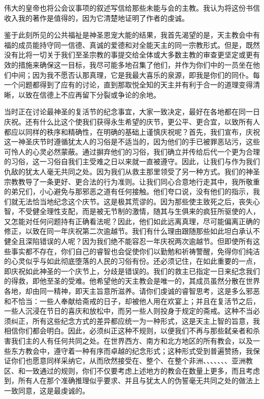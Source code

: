 伟大的皇帝也将公会议事项的叙述写信给那些未能与会的主教。我认为将这份书信收入我的著作是值得的，因为它清楚地证明了作者的虔诚。\par

\par

鉴于此刻所见的公共福祉是神圣恩宠大能的结果，我首先渴望的是，天主教会中有福的成员能持守同一信德、真诚的爱德和对全能天主的同一宗教形式。但是，既然没有比将一切关于我们至圣宗教的事提交给全体或大多数主教的审查更坚定或更有效的措施来确保这一目标，我尽可能多地召集了他们，并作为你们中的一员坐在他们中间；因为我不愿否认那真理，它是我最大喜乐的泉源，即我是你们的同仆。每一个问题都得到了应有的讨论，直到那取悦全知的天主并有利于合一的道理变得清晰，以致在信德上不应再留下分裂或争论的余地。\par

当时正在讨论最神圣的复活节的纪念事宜，大家一致决定，最好在各地都在同一日庆祝。还有什么比这个使我们获得永生希望的庆节，更公平、更合宜，以致所有人都应以同样的秩序和精确性，在明确的基础上谨慎庆祝呢？首先，我们宣布，庆祝这一神圣庆节时遵循犹太人的习俗是不适当的，因为他们的手已被罪恶玷污，这些可怜人的心灵必然蒙蔽。通过摒弃他们的习俗，我们确立并传给后代一个更为合理的习俗，这一习俗自我们主受难之日以来就一直被遵守。因此，让我们与作为我们仇敌的犹太人毫无共同之处。因为我们从救主那里领受了另一种方式。我们的神圣宗教教导了一条更好、更合法的行为准则。让我们同心合意地行走其中，我所敬重的弟兄们，小心避免与那邪恶之道有任何接触。他们夸口说，没有他们的指示，我们就无法恰当地纪念这个庆节。这是极其荒谬的。因为那些使主致死之后，丧失心智，不受健全理性支配，而是被无节制的激情，随其与生俱来的疯狂所驱使的人，又怎能对任何问题持有正确看法呢？因此，他们如此远离真理，尽可能偏离正确的修正，以致在同一年庆祝第二次逾越节。我们有什么理由跟随那些如此坦白承认不健全且深陷错误的人呢？因为我们绝不能容忍一年庆祝两次逾越节。但即使所有这些事实都不存在，你们自己的睿智也会促使你们以勤勉和祈祷警醒，免得你们纯洁的心灵似乎与如此彻底堕落的人民的习俗有份。还必须记住，在如此重要的一点，即庆祝如此神圣的一个庆节上，分歧是错误的。我们的救主已指定一日来纪念我们的得救，即他至圣的受难。他希望他的天主教会是唯一的，其成员虽然分散在世界各地，却由同一精神，即天主旨意所滋养。请你们虔诚的睿智思考，这是多么邪恶和不恰当：一些人奉献给斋戒的日子，却被他人用在欢宴上；并且在复活节之后，一些人沉浸在节日的喜庆和放松中，而另一些人则投身于规定的斋戒。这种不当必须纠正，所有这些纪念方式的差异都应统一为一种形式，这是天主上智的旨意，我相信你们都会明白。因此，必须纠正这种不规则，以便我们不再与那些弑亲者和杀害我们主的人有任何共同之处。在世界西方、南方和北方地区的所有教会，以及一些东方教会中，遵守着一种有序而卓越的纪念形式；这种形式受到普遍赞扬，我保证你们也愿意同样采纳它，从而欣然接受在、整个、在整个非洲、、、、、、、亚洲教区、和一致通过的规则，你们不仅要考虑上述地方的教会在数量上更多，而且考虑到，所有人在那个准确推理似乎要求、并且与犹太人的伪誓毫无共同之处的做法上一致同意，这是最虔诚的。\par

